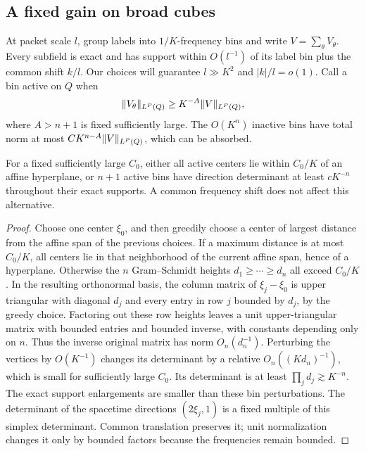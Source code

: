 \subsection{A fixed gain on broad cubes}

At packet scale $l$, group labels into $1/K$-frequency bins and write
$V=\sum_\theta V_\theta$.  Every subfield is exact and has support
within $O(l^{-1})$ of its label bin plus the common shift $k/l$.
Our choices will guarantee $l\gg K^2$ and $|k|/l=o(1)$.
Call a bin active on $Q$ when
\begin{equation}\label{s:activity}
 \lVert V_\theta\rVert_{L^P(Q)}\ge K^{-A}\lVert V\rVert_{L^P(Q)},
\end{equation}
where $A>n+1$ is fixed sufficiently large.  The $O(K^n)$ inactive
bins have total norm at most $CK^{n-A}\lVert V\rVert_{L^P(Q)}$, which can
be absorbed.

\begin{lemma}\label{s:simplex}
For a fixed sufficiently large $C_0$, either all active centers lie
within $C_0/K$ of an affine hyperplane, or $n+1$ active bins have
direction determinant at least $cK^{-n}$ throughout their exact
supports.  A common frequency shift does not affect this alternative.
\end{lemma}

\begin{proof}
Choose one center $\xi_0$, and then greedily choose a center of largest
distance from the affine span of the previous choices.  If a maximum
distance is at most $C_0/K$, all centers lie in that neighborhood of
the current affine span, hence of a hyperplane.  Otherwise the $n$
Gram--Schmidt heights $d_1\ge\cdots\ge d_n$ all exceed $C_0/K$.
In the resulting orthonormal basis, the column matrix of
$\xi_j-\xi_0$ is upper triangular with diagonal $d_j$ and every
entry in row $j$ bounded by $d_j$, by the greedy choice.  Factoring
out these row heights leaves a unit upper-triangular matrix with
bounded entries and bounded inverse, with constants depending only on
$n$.  Thus the inverse original matrix has norm $O_n(d_n^{-1})$.
Perturbing the vertices by $O(K^{-1})$ changes its determinant by a
relative $O_n((Kd_n)^{-1})$, which is small for sufficiently large
$C_0$.  Its determinant is at least $\prod_jd_j\gtrsim K^{-n}$.
The exact support enlargements are smaller than these bin perturbations.
The determinant of the spacetime directions $(2\xi_j,1)$ is a fixed
multiple of this simplex determinant.  Common translation preserves it;
unit normalization changes it only by bounded factors because the
frequencies remain bounded.
\end{proof}

